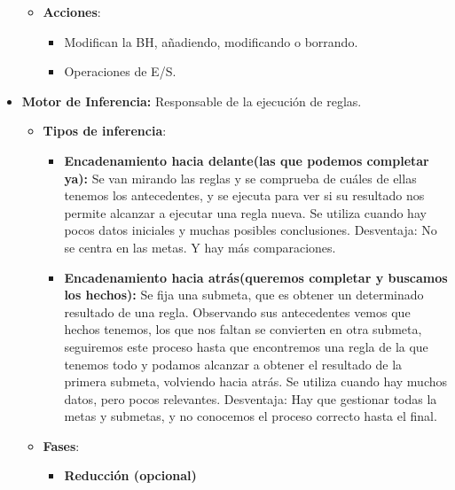 \documentclass[12pt, twoside, openright]{report} %
\begin{document}
\begin{itemize}
\begin{itemize}
\begin{itemize}
      \end{itemize}
    \item \textbf{Acciones}:
      

      \begin{itemize}
      \item Modifican la BH, añadiendo, modificando o borrando.
        
      \item Operaciones de E/S.
        
      \end{itemize}
    \end{itemize}
  \item \textbf{Motor de Inferencia:} Responsable de la ejecución de reglas.
    

    \begin{itemize}
    \item \textbf{Tipos de inferencia}:
      

      \begin{itemize}
      \item \textbf{Encadenamiento hacia delante(las que podemos completar
        ya):} Se van mirando las reglas y se comprueba de cuáles de
        ellas tenemos los antecedentes, y se ejecuta para ver si su
        resultado nos permite alcanzar a ejecutar una regla nueva. Se
        utiliza cuando hay pocos datos iniciales y muchas posibles
        conclusiones. Desventaja: No se centra en las metas. Y hay más
        comparaciones.
        \pagebreak
      \item \textbf{Encadenamiento hacia atrás(queremos completar y buscamos
        los hechos):} Se fija una submeta, que es obtener un determinado
        resultado de una regla. Observando sus antecedentes vemos que
        hechos tenemos, los que nos faltan se convierten en otra
        submeta, seguiremos este proceso hasta que encontremos una regla
        de la que tenemos todo y podamos alcanzar a obtener el resultado
        de la primera submeta, volviendo hacia atrás. Se utiliza cuando
        hay muchos datos, pero pocos relevantes. Desventaja: Hay que
        gestionar todas la metas y submetas, y no conocemos el proceso
        correcto hasta el final.
        
      \end{itemize}
    \item \textbf{Fases}:
      

      \begin{itemize}
      \item \textbf{Reducción (opcional)}
        

\end{itemize}
\end{itemize}
\end{itemize}
\end{document}

